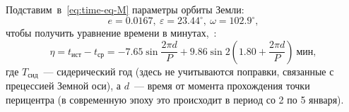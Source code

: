 Подставим~в~\eqref{eq:time-eq-M} параметры орбиты Земли:
\begin{equation*}
    e = 0.0167,~\varepsilon = 23.44^\circ,~\omega = 102.9^\circ,
\end{equation*}
чтобы получить уравнение времени в минутах,~:
\begin{equation}
    \eta = t_\text{ист} - t_\text{ср} =  -7.65 \sin \frac{2\pi d}{P} + 9.86 \sin 2 \left( 1.80 + \frac{2\pi d}{P} \right)~\text{мин},
\end{equation}
где $T_\text{сид}$~--- сидерический год (здесь не учитываются поправки, связанные с прецессией Земной оси), а $d$~--- время от момента прохождения точки перицентра (в современную эпоху это происходит в период со 2 по 5 января).



